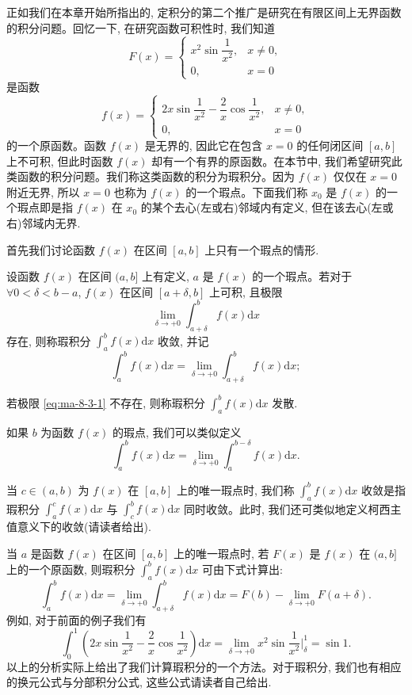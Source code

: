 正如我们在本章开始所指出的, 定积分的第二个推广是研究在有限区间上无界函数的积分问题。回忆一下, 在研究函数可积性时, 我们知道
\[
  F(x)=
  \begin{cases}
    x^2\sin\dfrac1{x^2}, & x\ne0,\\
    0, & x=0
  \end{cases}
\]
是函数
\[
  f(x)=
  \begin{cases}
    2x\sin\dfrac1{x^2}-\dfrac2x\cos\dfrac1{x^2}, & x\ne0,\\
    0, & x=0
  \end{cases}
\]
的一个原函数。函数 $f(x)$ 是无界的, 因此它在包含 $x=0$ 的任何闭区间 $[a,b]$ 上不可积, 但此时函数 $f(x)$ 却有一个有界的原函数。在本节中, 我们希望研究此类函数的积分问题。我们称这类函数的积分为瑕积分。因为 $f(x)$ 仅仅在 $x=0$ 附近无界, 所以 $x=0$ 也称为 $f(x)$ 的一个瑕点。下面我们称 $x_0$ 是 $f(x)$ 的一个瑕点即是指 $f(x)$ 在 $x_0$ 的某个去心(左或右)邻域内有定义, 但在该去心(左或右)邻域内无界.

首先我们讨论函数 $f(x)$ 在区间 $[a,b]$ 上只有一个瑕点的情形.

\begin{definition}\label{definition:ma-8-3-1}
设函数 $f(x)$ 在区间 $(a,b]$ 上有定义, $a$ 是 $f(x)$ 的一个瑕点。若对于 $\forall 0<\delta<b-a$, $f(x)$ 在区间 $[a+\delta,b]$ 上可积, 且极限
\begin{equation}
  \lim_{\delta\to+0}\int_{a+\delta}^b f(x)\mathrm dx
  \label{eq:ma-8-3-1}
\end{equation}
存在, 则称瑕积分 $\int_a^b f(x)\mathrm dx$ 收敛, 并记
\[
  \int_a^b f(x)\mathrm dx
  =
  \lim_{\delta\to+0}\int_{a+\delta}^b f(x)\mathrm dx;
\]
\end{definition}

若极限 \eqref{eq:ma-8-3-1} 不存在, 则称瑕积分 $\int_a^b f(x)\mathrm dx$ 发散.

如果 $b$ 为函数 $f(x)$ 的瑕点, 我们可以类似定义
\[
  \int_a^b f(x)\mathrm dx
  =
  \lim_{\delta\to+0}\int_a^{b-\delta}f(x)\mathrm dx.
\]

当 $c\in(a,b)$ 为 $f(x)$ 在 $[a,b]$ 上的唯一瑕点时, 我们称 $\int_a^b f(x)\mathrm dx$ 收敛是指瑕积分 $\int_a^c f(x)\mathrm dx$ 与 $\int_c^b f(x)\mathrm dx$ 同时收敛。此时, 我们还可类似地定义柯西主值意义下的收敛(请读者给出).

当 $a$ 是函数 $f(x)$ 在区间 $[a,b]$ 上的唯一瑕点时, 若 $F(x)$ 是 $f(x)$ 在 $(a,b]$ 上的一个原函数, 则瑕积分 $\int_a^b f(x)\mathrm dx$ 可由下式计算出:
\[
  \int_a^b f(x)\mathrm dx
  =
  \lim_{\delta\to+0}\int_{a+\delta}^b f(x)\mathrm dx
  =
  F(b)-\lim_{\delta\to+0}F(a+\delta).
\]
例如, 对于前面的例子我们有
\[
  \int_0^1\left(2x\sin\frac1{x^2}-\frac2x\cos\frac1{x^2}\right)\mathrm dx
  =
  \lim_{\delta\to+0}x^2\sin\frac1{x^2}\bigg|_\delta^1
  =
  \sin1.
\]
以上的分析实际上给出了我们计算瑕积分的一个方法。对于瑕积分, 我们也有相应的换元公式与分部积分公式, 这些公式请读者自己给出.

